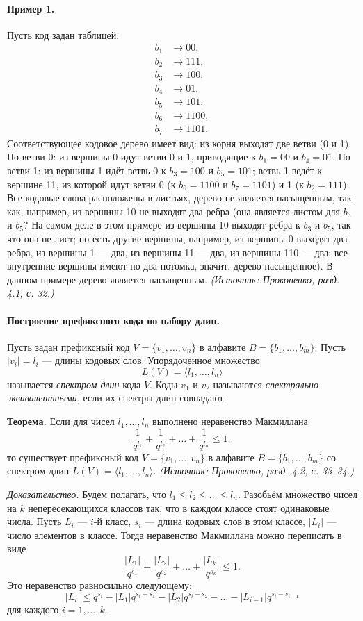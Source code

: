 \documentclass[a4paper,12pt]{article}
\begin{document}
\paragraph{Пример 1.}
Пусть код задан таблицей:
\[
\begin{aligned}
b_1&\to 00,\\
b_2&\to 111,\\
b_3&\to 100,\\
b_4&\to 01,\\
b_5&\to 101,\\
b_6&\to 1100,\\
b_7&\to 1101.
\end{aligned}
\]
Соответствующее кодовое дерево имеет вид: из корня выходят две ветви (0 и 1). По ветви 0: из вершины 0 идут ветви 0 и 1, приводящие к \(b_1=00\) и \(b_4=01\). По ветви 1: из вершины 1 идёт ветвь 0 к \(b_3=100\) и \(b_5=101\); ветвь 1 ведёт к вершине 11, из которой идут ветви 0 (к \(b_6=1100\) и \(b_7=1101\)) и 1 (к \(b_2=111\)). Все кодовые слова расположены в листьях, дерево не является насыщенным, так как, например, из вершины 10 не выходят два ребра (она является листом для \(b_3\) и \(b_5\)? На самом деле в этом примере из вершины 10 выходят рёбра к \(b_3\) и \(b_5\), так что она не лист; но есть другие вершины, например, из вершины 0 выходят два ребра, из вершины 1 — два, из вершины 11 — два, из вершины 110 — два; все внутренние вершины имеют по два потомка, значит, дерево насыщенное). В данном примере дерево является насыщенным.
\textit{(Источник: Прокопенко, разд. 4.1, с. 32.)}

\paragraph{Построение префиксного кода по набору длин.}
Пусть задан префиксный код \(V=\{v_1,\dots,v_n\}\) в алфавите \(B=\{b_1,\dots,b_m\}\). Пусть \(|v_i|=l_i\) — длины кодовых слов. Упорядоченное множество
\[
L(V)=\langle l_1,\dots,l_n\rangle
\]
называется \emph{спектром длин} кода \(V\). Коды \(v_1\) и \(v_2\) называются \emph{спектрально эквивалентными}, если их спектры длин совпадают.

\textbf{Теорема.} Если для чисел \(l_1,\dots,l_n\) выполнено неравенство Макмиллана
\[
\frac{1}{q^{l_1}}+\frac{1}{q^{l_2}}+\dots+\frac{1}{q^{l_n}}\le 1,
\]
то существует префиксный код \(V=\{v_1,\dots,v_n\}\) в алфавите \(B=\{b_1,\dots,b_m\}\) со спектром длин \(L(V)=\langle l_1,\dots,l_n\rangle\).
\textit{(Источник: Прокопенко, разд. 4.2, с. 33--34.)}

\emph{Доказательство.} Будем полагать, что \(l_1\le l_2\le\dots\le l_n\). Разобьём множество чисел на \(k\) непересекающихся классов так, что в каждом классе стоят одинаковые числа. Пусть \(L_i\) — \(i\)-й класс, \(s_i\) — длина кодовых слов в этом классе, \(|L_i|\) — число элементов в классе. Тогда неравенство Макмиллана можно переписать в виде
\[
\frac{|L_1|}{q^{s_1}}+\frac{|L_2|}{q^{s_2}}+\dots+\frac{|L_k|}{q^{s_k}}\le 1.
\]
Это неравенство равносильно следующему:
\[
|L_i|\le q^{s_i}-|L_1|q^{s_i-s_1}-|L_2|q^{s_i-s_2}-\dots-|L_{i-1}|q^{s_i-s_{i-1}}
\]
для каждого \(i=1,\dots,k\).
\end{document}
